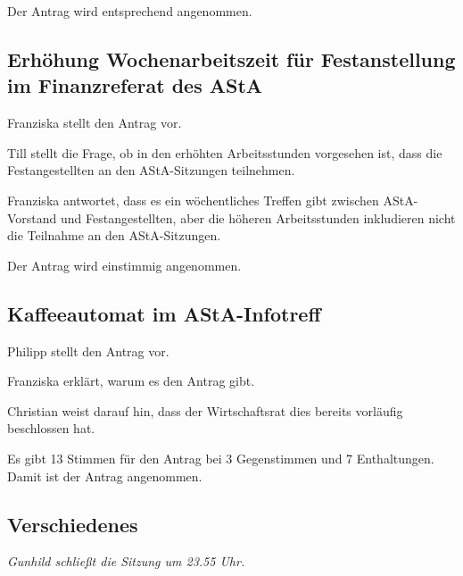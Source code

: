 \documentclass[ngerman,headheight=70pt]{scrartcl}
\begin{document}
    Der Antrag wird entsprechend angenommen.

    \subsection{Erhöhung Wochenarbeitszeit für Festanstellung im Finanzreferat des AStA}

    Franziska stellt den Antrag vor.

    Till stellt die Frage, ob in den erhöhten Arbeitsstunden vorgesehen ist,
    dass die Festangestellten an den AStA-Sitzungen teilnehmen.

    Franziska antwortet, dass es ein wöchentliches Treffen gibt zwischen AStA-Vorstand
    und Festangestellten, aber die höheren Arbeitsstunden inkludieren nicht
    die Teilnahme an den AStA-Sitzungen.

    Der Antrag wird einstimmig angenommen.

    \subsection{Kaffeeautomat im AStA-Infotreff}

    Philipp stellt den Antrag vor.

    Franziska erklärt, warum es den Antrag gibt.

    Christian weist darauf hin, dass der Wirtschaftsrat dies bereits vorläufig
    beschlossen hat.

    Es gibt 13 Stimmen für den Antrag bei 3 Gegenstimmen und 7 Enthaltungen.
    Damit ist der Antrag angenommen.

    \subsection{Verschiedenes}

    \textit{Gunhild schließt die Sitzung um 23.55 Uhr.}
\end{document}
